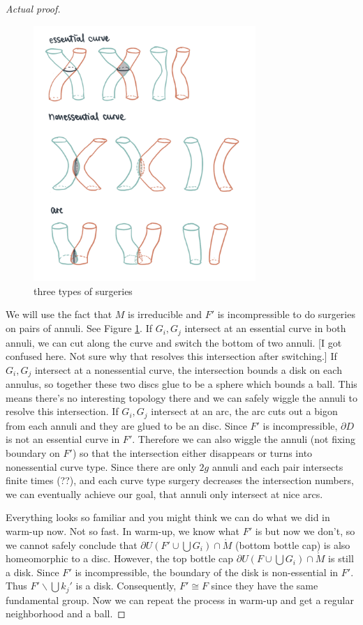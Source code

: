 \documentclass[12pt]{amsart}
\theoremstyle{remark}
\begin{document}
\begin{proof}[Actual proof]
	\begin{figure}
		\centering
		\includegraphics[width = 0.75\textwidth]{cut.jpeg}
		\caption{three types of surgeries}
		\label{fig:cuts}
	\end{figure}

	We will use the fact that \(M\) is irreducible and \(F'\) is incompressible to do surgeries on pairs of annuli. See Figure \ref{fig:cuts}. If \(G_i, G_j\) intersect at an essential curve in both annuli, we can cut along the curve and switch the bottom of two annuli. [I got confused here. Not sure why that resolves this intersection after switching.] If \(G_i, G_j\) intersect at a nonessential curve, the intersection bounds a disk on each annulus, so together these two discs glue to be a sphere which bounds a ball. This means there's no interesting topology there and we can safely wiggle the annuli to resolve this intersection. If \(G_i, G_j\) intersect at an arc, the arc cuts out a bigon from each annuli and they are glued to be an disc. Since \(F'\) is incompressible, \(\partial D\) is not an essential curve in \(F'\). Therefore we can also wiggle the annuli (not fixing boundary on \(F'\)) so that the intersection either disappears or turns into nonessential curve type.  Since there are only \(2g\) annuli and each pair intersects finite times (??), and each curve type surgery decreases the intersection numbers, we can eventually achieve our goal, that annuli only intersect at nice arcs.

	Everything looks so familiar and you might think we can do what we did in warm-up now. Not so fast. In warm-up, we know what \(F'\) is but now we don't, so we cannot safely conclude that  \(\partial U(F' \cup \bigcup G_i) \cap \mathring{M}\) (bottom bottle cap) is also homeomorphic to a disc. 
	However, the top bottle cap \(\partial U(F \cup \bigcup G_i) \cap \mathring{M}\) is still a disk. Since \(F'\) is incompressible, the boundary of the disk is non-essential in \(F'\). Thus \(F'\backslash \bigcup k_j'\) is a disk. Consequently, \(F' \cong F\) since they have the same fundamental group. 
	Now we can repeat the process in warm-up and get a regular neighborhood and a ball. 


\end{proof}
\end{document}

